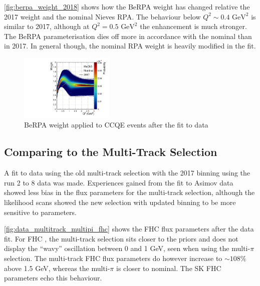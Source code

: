\autoref{fig:berpa_weight_2018} shows how the BeRPA weight has changed relative the 2017 weight and the nominal Nieves RPA. The behaviour below $Q^2\sim0.4\text{ GeV}^2$ is similar to 2017, although at $Q^2=0.5\text{ GeV}^2$ the enhancement is much stronger. The BeRPA parameterisation dies off more in accordance with the nominal than in 2017. In general though, the nominal RPA weight is heavily modified in the fit.
\begin{figure}[h]
	\includegraphics[width=0.4\textwidth, trim={0mm 0mm 0mm 0mm}, clip]{figures/mach3/2018/data/2018a_MultiPi_Binningv6_NewCov_Data_merge_BeRPA}
	\caption{BeRPA weight applied to CCQE events after the fit to data}
	\label{fig:berpa_weight_2018}
\end{figure}

\subsection{Comparing to the Multi-Track Selection}
A fit to data using the old multi-track selection with the 2017 binning using the run 2 to 8 data was made. Experiences gained from the fit to Asimov data showed less bias in the flux parameters for the multi-track selection, although the likelihood scans showed the new selection with updated binning to be more sensitive to parameters.

\autoref{fig:data_multitrack_multipi_fhc} shows the FHC flux parameters after the data fit. For FHC \numu, the multi-track selection sits closer to the priors and does not display the ``wavy'' oscillation between 0 and 1 GeV, seen when using the multi-$\pi$ selection. The multi-track FHC \numu flux parameters do however increase to $\sim108\%$ above 1.5 GeV, whereas the multi-$\pi$ is closer to nominal. The SK FHC \numu parameters echo this behaviour.

